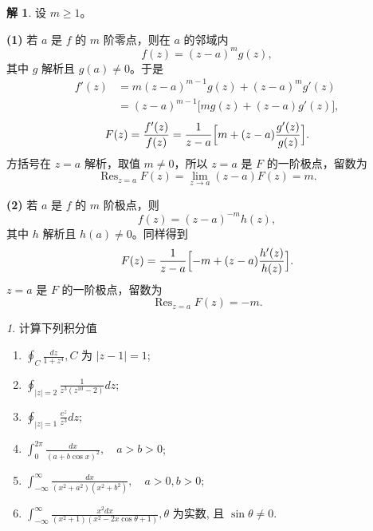 \documentclass[11pt]{article}
\newcommand{\Res}{\operatorname{Res}}
\theoremstyle{remark}
\newtheorem{problem}{}
\theoremstyle{definition}
\newtheorem{solution}{解}
\begin{document}
\begin{solution}
设 $m\geq 1$。

\textbf{(1)}
若 $a$ 是 $f$ 的 $m$ 阶零点，则在 $a$ 的邻域内
\[
f(z)=(z-a)^{m}g(z),
\]
其中 $g$ 解析且 $g(a)\neq 0$。于是
\begin{align*}
f'(z)
&=m(z-a)^{m-1}g(z)+(z-a)^{m}g'(z)\\
&=(z-a)^{m-1}\bigl[mg(z)+(z-a)g'(z)\bigr],
\end{align*}
\[
F(z)=\frac{f'(z)}{f(z)}
=\frac{1}{z-a}\Bigl[m+(z-a)\frac{g'(z)}{g(z)}\Bigr].
\]
方括号在 $z=a$ 解析，取值 $m\neq 0$，所以 $z=a$ 是 $F$ 的一阶极点，留数为
\[
\Res_{z=a}F(z)
=\lim_{z\to a}(z-a)F(z)
=m.
\]

\textbf{(2)}
若 $a$ 是 $f$ 的 $m$ 阶极点，则
\[
f(z)=(z-a)^{-m}h(z),
\]
其中 $h$ 解析且 $h(a)\neq 0$。同样得到
\[
F(z)=\frac{1}{z-a}\Bigl[-m+(z-a)\frac{h'(z)}{h(z)}\Bigr].
\]
$z=a$ 是 $F$ 的一阶极点，留数为
\[
\Res_{z=a}F(z)=-m.
\]
\end{solution}

\begin{problem}
  计算下列积分值
  \begin{enumerate}
    \item $\oint_C \frac{d z}{1+z^4}, C$ 为 $|z-1|=1$;
    \item $\oint_{|z|=2} \frac{1}{z^3\left(z^{10}-2\right)} d z$;
    \item $\oint_{|z|=1} \frac{e^z}{z^3} d z$; 
    \item $\int_0^{2 \pi} \frac{d x}{(a+b \cos x)^2}, \quad a>b>0$;
    \item $\int_{-\infty}^{\infty} \frac{d x}{(x^2 + a^2)(x^2+b^2)}, \quad a>0, b>0$;
    \item $\int_{-\infty}^{\infty} \frac{x^2 d x}{\left(x^2+1\right)\left(x^2-2 x \cos \theta+1\right)}, \theta$ 为实数, 且 $\sin \theta \neq 0$.
  \end{enumerate}
\end{problem}
\end{document}
